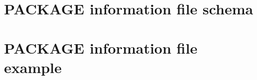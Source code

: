 \section[sec:package information file schema]{PACKAGE information file schema}

\section[sec:package information file example]{PACKAGE information file example}

